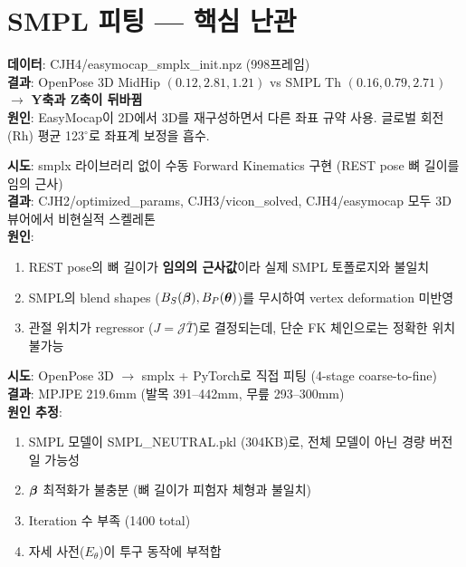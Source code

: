 \documentclass[11pt, a4paper]{report}
\begin{document}
\section{SMPL 피팅 --- 핵심 난관}

\begin{failbox}[title={실패 4: EasyMocap SMPL 좌표계 불일치}]
\textbf{데이터}: CJH4/easymocap\_smplx\_init.npz (998프레임)\\
\textbf{결과}: OpenPose 3D MidHip $(0.12, 2.81, 1.21)$ vs SMPL Th $(0.16, 0.79, 2.71)$ $\rightarrow$ \textbf{Y축과 Z축이 뒤바뀜}\\
\textbf{원인}: EasyMocap이 2D에서 3D를 재구성하면서 다른 좌표 규약 사용. 글로벌 회전(Rh) 평균 123$^\circ$로 좌표계 보정을 흡수.
\end{failbox}

\begin{failbox}[title={실패 5: Manual FK로 SMPL 관절 위치 계산 실패}]
\textbf{시도}: smplx 라이브러리 없이 수동 Forward Kinematics 구현 (REST pose 뼈 길이를 임의 근사)\\
\textbf{결과}: CJH2/optimized\_params, CJH3/vicon\_solved, CJH4/easymocap 모두 3D 뷰어에서 비현실적 스켈레톤\\
\textbf{원인}:
\begin{enumerate}[nosep]
  \item REST pose의 뼈 길이가 \textbf{임의의 근사값}이라 실제 SMPL 토폴로지와 불일치
  \item SMPL의 blend shapes ($B_S(\bm{\beta}), B_P(\bm{\theta})$)를 무시하여 vertex deformation 미반영
  \item 관절 위치가 regressor ($J = \mathcal{J}\bar{T}$)로 결정되는데, 단순 FK 체인으로는 정확한 위치 불가능
\end{enumerate}
\end{failbox}

\begin{failbox}[title={실패 6: 새 SMPL 피팅 (서버) --- MPJPE 219.6mm}]
\textbf{시도}: OpenPose 3D $\rightarrow$ smplx + PyTorch로 직접 피팅 (4-stage coarse-to-fine)\\
\textbf{결과}: MPJPE 219.6mm (발목 391--442mm, 무릎 293--300mm)\\
\textbf{원인 추정}:
\begin{enumerate}[nosep]
  \item SMPL 모델이 SMPL\_NEUTRAL.pkl (304KB)로, 전체 모델이 아닌 경량 버전일 가능성
  \item $\bm{\beta}$ 최적화가 불충분 (뼈 길이가 피험자 체형과 불일치)
  \item Iteration 수 부족 (1400 total)
  \item 자세 사전($E_\theta$)이 투구 동작에 부적합
\end{enumerate}
\end{failbox}
\end{document}
